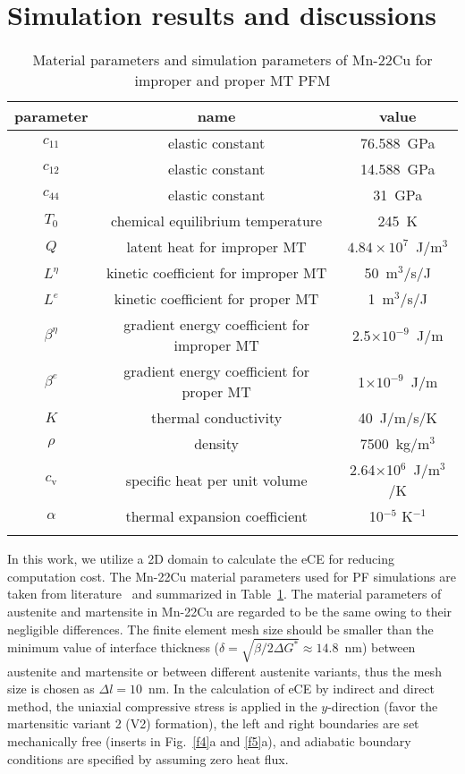 \documentclass[reprint,3p,sort&compress,times,onecolumn]{elsarticle}
\begin{document}
\section{Simulation results and discussions}\label{sec4}
\begin{table}[!t]
\centering
\caption{Material parameters and simulation parameters of Mn-22Cu for improper and proper MT PFM}
\begin{tabular}{ccc}
\toprule[1.5pt]  %
parameter & name&  value \\
\midrule[0.75pt]  %
$c_{11}$&  elastic constant& 76.588~GPa\\
$c_{12}$&  elastic constant&14.588~GPa\\
$c_{44}$&  elastic constant&31~GPa \\ 
$T_0$& chemical equilibrium temperature& 245~K\\
$Q$& latent heat for improper MT & $4.84\times 10^7$~J/m$^3$  \\
$L^{\eta}$& kinetic coefficient for improper MT& 50~m$^3$/s/J \\
$L^{e}$& kinetic coefficient for proper MT& 1~m$^3$/s/J \\
$\beta^{\eta}$& gradient energy coefficient for improper MT& 2.5$\times 10^{-9}$~J/m \\
$\beta^{e}$& gradient energy coefficient for proper MT& 1$\times 10^{-9}$~J/m \\
$K$& thermal conductivity& 40~J/m/s/K\\
$\rho$& density& 7500~kg/m$^3$\\
$c_\text{v}$& specific heat per unit volume& 2.64$\times$10$^6$~J/m$^3$/K\\
$\alpha$& thermal expansion coefficient& 10$^{-5}$ K$^{-1}$\\
\bottomrule[1.5pt] \label{t1}%
\end{tabular}
\end{table}

In this work, we utilize a 2D domain to calculate the eCE for reducing computation  cost. The Mn-22Cu material parameters used for PF simulations are taken from literature~\cite{cui2017three} and summarized in Table~\ref{t1}. 
The material parameters of austenite and martensite in Mn-22Cu are regarded to be the same owing to their negligible differences.
The finite element mesh size should be smaller than the minimum value of interface thickness ($\delta=\sqrt{\beta/2\Delta G^*} \approx 14.8$~nm) between austenite and martensite or between different austenite variants, thus the mesh size is chosen as $\Delta l=10$~nm. 
In the calculation of eCE by indirect and direct method, the uniaxial compressive stress is applied in the $y$-direction (favor the martensitic variant 2 (V2) formation), the left and right boundaries are set mechanically free (inserts in Fig.~\ref{f4}a and \ref{f5}a), and adiabatic boundary conditions are specified by assuming zero heat flux.
\end{document}
